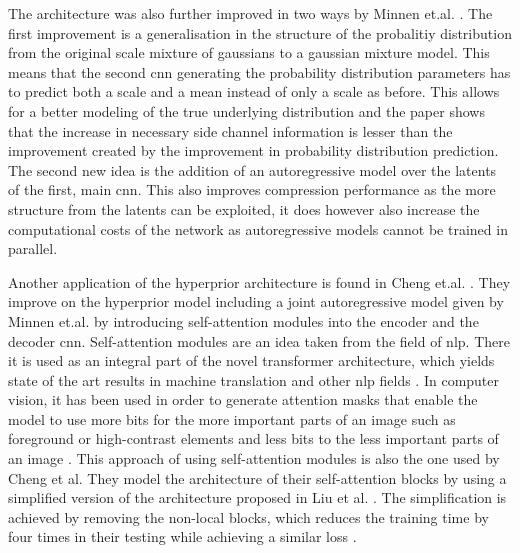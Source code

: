 The architecture was also further improved in two ways by Minnen et.al. \citep{minnen_joint_2018}. The first improvement is a generalisation in the structure of the probalitiy distribution from the original scale mixture of gaussians \citep{wainwright_scale_1999} to a gaussian mixture model. This means that the second \ac{cnn} generating the probability distribution parameters has to predict both a scale and a mean instead of only a scale as before. This allows for a better modeling of the true underlying distribution and the paper shows that the increase in necessary side channel information is lesser than the improvement created by the improvement in probability distribution prediction.
The second new idea is the addition of an autoregressive model over the latents of the first, main \ac{cnn}. This also improves compression performance as the more structure from the latents can be exploited, it does however also increase the computational costs of the network as autoregressive models cannot be trained in parallel. 

Another application of the hyperprior architecture is found in Cheng et.al. \citep{cheng_learned_2020}. They improve on the hyperprior model including a joint autoregressive model given by Minnen et.al. \citep{minnen_joint_2018} by introducing self-attention modules into the encoder and the decoder \ac{cnn}. Self-attention modules are an idea taken from the field of \ac{nlp}. There it is used as an integral part of the novel transformer architecture, which yields state of the art results in machine translation and other \ac{nlp} fields \citep{vaswani_attention_2017}. In computer vision, it has been used in order to generate attention masks that enable the model to use more bits for the more important parts of an image such as foreground or high-contrast elements and less bits to the less important parts of an image \citep{liu_non-local_2019,li_learning_2017,mentzer_conditional_2019}. This approach of using self-attention modules is also the one used by Cheng et al. They model the architecture of their self-attention blocks by using a simplified version of the architecture proposed in Liu et al. \citep{liu_non-local_2019}. The simplification is achieved by removing the non-local blocks, which reduces the training time by four times in their testing while achieving a similar loss \citep{cheng_learned_2020}.
